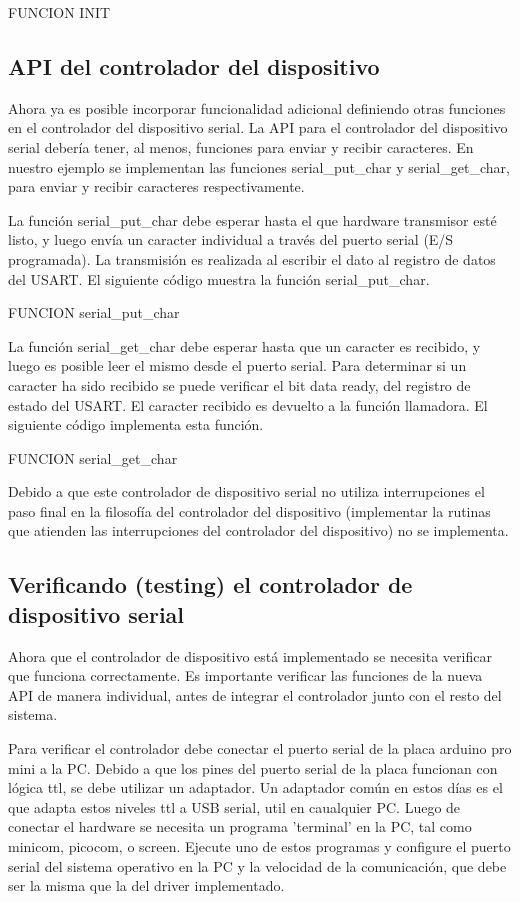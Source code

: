 \documentclass[output=paper, 
colorlinks,
citecolor=brown,
newtxmath
]{langscibook}
\begin{document}
FUNCION INIT


\subsection {API del controlador del dispositivo}


Ahora ya es posible incorporar funcionalidad adicional definiendo otras
funciones en el controlador del dispositivo serial.
La API para el controlador del dispositivo serial debería tener, al menos,
funciones para enviar y recibir caracteres. En nuestro ejemplo
se implementan las funciones serial\_put\_char y serial\_get\_char, 
para enviar y recibir caracteres respectivamente.


La función serial\_put\_char debe esperar hasta el que hardware
transmisor esté listo, y 
luego envía un caracter individual a través del puerto serial (E/S programada).
La
transmisión es realizada al escribir el dato al registro de datos del USART.
El siguiente código muestra la función serial\_put\_char.

FUNCION serial\_put\_char


La función serial\_get\_char debe esperar hasta que un caracter es recibido, y 
luego es posible leer el mismo desde el puerto serial. 
Para determinar si un caracter ha sido recibido se puede verificar
el bit data ready, del registro de estado del USART. El caracter
recibido es devuelto a la función llamadora. 
El siguiente código implementa esta función.

FUNCION serial\_get\_char

Debido a que este controlador de dispositivo serial no utiliza interrupciones
el paso final en la filosofía del controlador del dispositivo (implementar
la rutinas que atienden las interrupciones del controlador del dispositivo)
no se implementa.


\subsection *{Verificando (testing) el controlador de dispositivo serial}

Ahora que el controlador de dispositivo está implementado se necesita verificar
que funciona correctamente. Es importante verificar las funciones de la nueva
API de manera individual, 
antes de integrar el controlador junto con el resto del sistema.

Para verificar el controlador debe conectar el puerto serial de la placa
arduino pro mini a la PC. Debido a que los pines del puerto serial de la placa
funcionan con lógica ttl, se debe utilizar un adaptador. Un adaptador
común en estos días es el que adapta estos niveles ttl a USB serial, util 
en caualquier PC.
Luego de conectar el hardware se necesita un programa 'terminal' en la PC, tal
como minicom, picocom, o screen. Ejecute uno de estos programas
y configure el puerto serial del sistema operativo en la PC y la
velocidad de la comunicación, que debe ser la misma que la del driver 
implementado.
\end{document}
